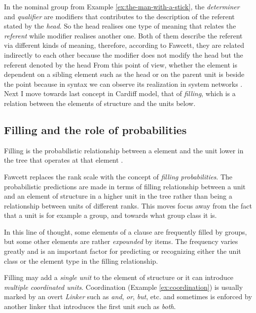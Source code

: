 In the nominal group from Example \ref{ex:the-man-with-a-stick}, the \textit{determiner} and \textit{qualifier} are modifiers that contributes to the description of the referent stated by the \textit{head}. So the head realises one type of meaning that relates the \textit{referent} while modifier realises another one. Both of them describe the referent via different kinds of meaning, therefore, according to Fawcett, they are related indirectly to each other because the modifier does not modify the head but the referent denoted by the head From this point of view, whether the element is dependent on a sibling element such as the head or on the parent unit is beside the point because in syntax we can observe its realization in system networks \citep[216--217]{Fawcett2000}.
Next I move towards last concept in Cardiff model, that of \textit{filling}, which is a relation between the elements of structure and the units below.

\subsection{Filling and the role of probabilities}
\begin{definition}[Filling]\label{def:filling}
    Filling is the probabilistic relationship between a element and the unit lower in the tree that operates at that element \citep[238, 251]{Fawcett2000}. 
\end{definition}

Fawcett replaces the rank scale with the concept of \textit{filling probabilities}. The probabilistic predictions are made in terms of filling relationship between a unit and an element of structure in a higher unit in the tree rather than being a relationship between units of different ranks. This moves focus away from the fact that a unit is for example a group, and towards what group class it is. 

In this line of thought, some elements of a clause are frequently filled by groups, but some other elements are rather \textit{expounded} by items. The frequency varies greatly and is an important factor for predicting or recognizing either the unit class or the element type in the filling relationship. 

Filling may add a \textit{single unit} to the element of structure or it can introduce \textit{multiple coordinated units}. Coordination (Example \ref{ex:coordination}) is usually marked by an overt \textit{Linker} such as \textit{and}, \textit{or}, \textit{but}, etc. and sometimes is enforced by another linker that introduces the first unit such as \textit{both}.

